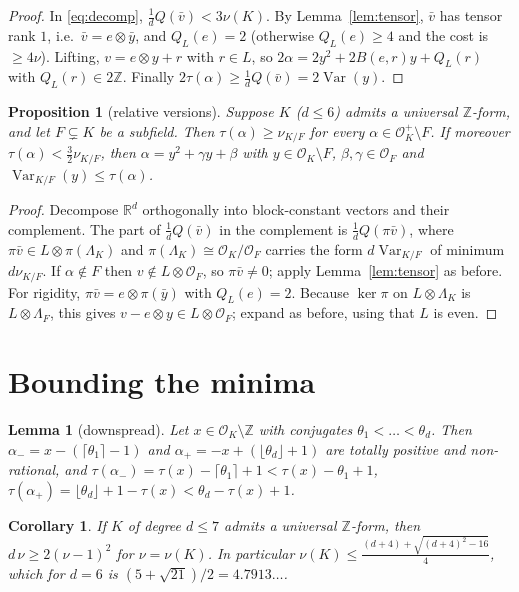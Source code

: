 \documentclass[11pt]{amsart}
\newtheorem{lemma}[theorem]{Lemma}
\newtheorem{proposition}[theorem]{Proposition}
\newtheorem{corollary}[theorem]{Corollary}
\theoremstyle{definition}
\DeclareMathOperator{\Var}{Var}
\newcommand{\OK}{\mathcal{O}_K}
\newcommand{\OF}{\mathcal{O}_F}
\newcommand{\Z}{\mathbb{Z}}
\newcommand{\R}{\mathbb{R}}
\newcommand{\LamK}{\Lambda_K}
\newcommand{\nurel}{\nu_{K/F}}
\begin{document}
\begin{proof}
In \eqref{eq:decomp}, $\frac1dQ(\bar v)<3\nu(K)$.  By Lemma~\ref{lem:tensor}, $\bar v$ has
tensor rank $1$, i.e.\ $\bar v=e\otimes\bar y$, and $Q_L(e)=2$ (otherwise $Q_L(e)\ge4$ and the
cost is $\ge4\nu$).  Lifting, $v=e\otimes y+r$ with $r\in L$, so
$2\alpha=2y^2+2B(e,r)y+Q_L(r)$ with $Q_L(r)\in2\Z$.  Finally $2\tau(\alpha)\ge\frac1dQ(\bar v)=
2\Var(y)$.
\end{proof}

\begin{proposition}[relative versions]\label{prop:relative}
Suppose $K$ ($d\le 6$) admits a universal $\Z$-form, and let $F\subsetneq K$ be a subfield.
Then $\tau(\alpha)\ge\nurel$ for every $\alpha\in\OK^+\setminus F$.  If moreover
$\tau(\alpha)<\frac32\nurel$, then $\alpha=y^2+\gamma y+\beta$ with $y\in\OK\setminus F$,
$\beta,\gamma\in\OF$ and $\Var_{K/F}(y)\le\tau(\alpha)$.
\end{proposition}

\begin{proof}
Decompose $\R^d$ orthogonally into block-constant vectors and their complement.  The part
of $\frac1dQ(\bar v)$ in the complement is $\frac1dQ(\pi\bar v)$, where $\pi\bar v\in
L\otimes\pi(\LamK)$ and $\pi(\LamK)\cong\OK/\OF$ carries the form $d\Var_{K/F}$ of minimum
$d\nurel$.  If $\alpha\notin F$ then $v\notin L\otimes\OF$, so $\pi\bar v\neq0$; apply
Lemma~\ref{lem:tensor} as before.  For rigidity, $\pi\bar v=e\otimes\pi(\bar y)$ with
$Q_L(e)=2$.  Because $\ker\pi$ on $L\otimes\LamK$ is $L\otimes\Lambda_F$, this gives
$v-e\otimes y\in L\otimes\OF$; expand as before, using that $L$ is even.
\end{proof}

\section{Bounding the minima}\label{sec:bounds}

\begin{lemma}[downspread]\label{lem:downspread}
Let $x\in\OK\setminus\Z$ with conjugates $\theta_1<\dots<\theta_d$.  Then
$\alpha_-=x-(\lceil\theta_1\rceil-1)$ and $\alpha_+=-x+(\lfloor\theta_d\rfloor+1)$ are totally
positive and non-rational, and
$\tau(\alpha_-)=\tau(x)-\lceil\theta_1\rceil+1<\tau(x)-\theta_1+1$,
$\tau(\alpha_+)=\lfloor\theta_d\rfloor+1-\tau(x)<\theta_d-\tau(x)+1$.
\end{lemma}

\begin{corollary}\label{cor:nubound}
If $K$ of degree $d\le7$ admits a universal $\Z$-form, then $d\,\nu\ge2(\nu-1)^2$ for
$\nu=\nu(K)$.  In particular $\nu(K)\le\frac{(d+4)+\sqrt{(d+4)^2-16}}{4}$, which for $d=6$
is $(5+\sqrt{21})/2=4.7913\ldots$.
\end{corollary}
\end{document}
